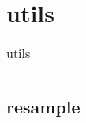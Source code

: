 \chapter{utils\label{utils}}
\begin{table}
    \centering
    \caption{utils}
    \begin{tabular}{ll}
        \hline
        \nameref{resample} & \\
        \hline
    \end{tabular}
\end{table}
\section{resample\label{resample}}